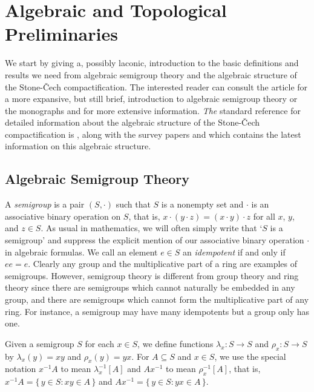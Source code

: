 \documentclass[12pt]{article}
\theoremstyle{plain}
\theoremstyle{definition}
\begin{document}
\section{Algebraic and Topological Preliminaries}
We start by giving a, possibly laconic, introduction to the basic
definitions and results we need from algebraic semigroup theory and the
algebraic structure of the Stone-\v{C}ech compactification.
The interested reader can consult the article \cite{Hollings:2007uq}
for a more expansive, but still brief, introduction to algebraic
semigroup theory or the monographs \cite{Clifford:1961fk} and
\cite{Clifford:1967fk} for more extensive information.
\textsl{The} standard reference for detailed information about the
algebraic structure of the Stone-\v{C}ech compactification is
\cite{Hindman:1998fk}, along with the survey papers \cite{Hindman:2002kx} and
\cite{Hindman:2010uq} which contains the latest information on this
algebraic structure. 

\subsection{Algebraic Semigroup Theory}
A \textsl{semigroup} is a pair $(S, \cdot)$ such that $S$ is a
nonempty set
and $\cdot$ is an associative binary operation on $S$, that is, $x \cdot
(y \cdot z) = (x \cdot y) \cdot z$ for all $x$, $y$, and $z \in S$.
As usual in mathematics, we will often simply write that `$S$ is a
semigroup' and suppress the explicit mention
of our associative binary operation $\cdot$ in algebraic formulas. 
We call an element $e \in S$ an \textsl{idempotent} if and only if $ee
= e$. 
Clearly any group and the multiplicative part of a ring are examples
of semigroups.
However, semigroup theory is different from group theory and ring
theory since there are semigroups which cannot naturally be embedded
in any group, and there are semigroups which cannot form the
multiplicative part of any ring.
For instance, a semigroup may have many idempotents but a group only
has one.

Given a semigroup $S$ for each $x \in S$, we define functions
$\lambda_x \colon S \to S$ and $\rho_x \colon S \to S$ by
$\lambda_x(y) = xy$ and $\rho_x(y) = yx$. 
For $A \subseteq S$ and $x \in S$, we use the special notation
$x^{-1}A$ to mean $\lambda_x^{-1}[A]$ and $Ax^{-1}$ to mean
$\rho_x^{-1}[A]$, that is, $x^{-1}A = \{\, y \in S : xy \in A \,\}$
and $Ax^{-1} = \{\, y \in S : yx \in A \,\}$.
\end{document}
